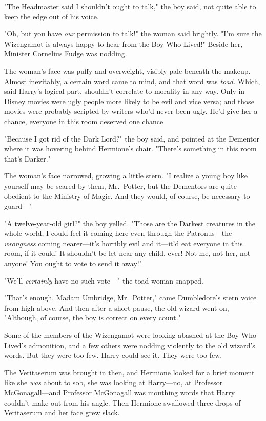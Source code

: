 "The Headmaster said I shouldn't ought to talk," the boy said, not quite able
to keep the edge out of his voice.

"Oh, but you have \emph{our} permission to talk!" the woman said brightly. "I'm
sure the Wizengamot is always happy to hear from the Boy-Who-Lived!" Beside
her, Minister Cornelius Fudge was nodding.

The woman's face was puffy and overweight, visibly pale beneath the makeup.
Almost inevitably, a certain word came to mind, and that word was \emph{toad.}
Which, said Harry's logical part, shouldn't correlate to morality in any way.
Only in Disney movies were ugly people more likely to be evil and vice versa;
and those movies were probably scripted by writers who'd never been ugly. He'd
give her a chance, everyone in this room deserved one chance{\el}

"Because I got rid of the Dark Lord?" the boy said, and pointed at the Dementor
where it was hovering behind Hermione's chair. "There's something in this room
that's Darker."

The woman's face narrowed, growing a little stern. "I realize a young boy like
yourself may be scared by them, Mr.~Potter, but the Dementors are quite
obedient to the Ministry of Magic. And they would, of course, be necessary to
guard\mbox{---}"

"A twelve-year-old girl?" the boy yelled. "Those are the Darkest creatures in
the whole world, I could feel it coming here even through the Patronus---the
\emph{wrongness} coming nearer---it's horribly evil and it---it'd eat everyone
in this room, if it could! It shouldn't be let near any child, ever! Not me,
not her, not anyone! You ought to vote to send it away!"

"We'll \emph{certainly} have no such vote\mbox{---}" the toad-woman snapped.

"That's enough, Madam Umbridge, Mr.~Potter," came Dumbledore's stern voice from
high above. And then after a short pause, the old wizard went on, "Although, of
course, the boy is correct on every count."

Some of the members of the Wizengamot were looking abashed at the
Boy-Who-Lived's admonition, and a few others were nodding violently to the old
wizard's words. But they were too few. Harry could see it. They were too few.

The Veritaserum was brought in then, and Hermione looked for a brief moment
like she \emph{was} about to sob, she was looking at Harry---no, at Professor
McGonagall---and Professor McGonagall was mouthing words that Harry couldn't
make out from his angle. Then Hermione swallowed three drops of Veritaserum and
her face grew slack.

